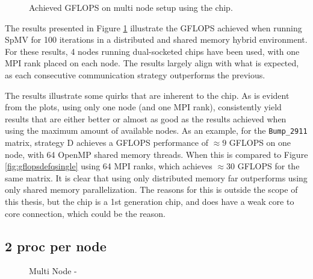 \begin{figure}[H]
    \centering
    \caption{Achieved GFLOPS on multi node setup using the  chip.}
    \label{fig:gflopsdefqmulti}
\end{figure}

The results presented in Figure \ref{fig:gflopsdefqmulti} illustrate the GFLOPS achieved when running SpMV for 100 iterations in a distributed and shared memory hybrid environment. For these results, 4 nodes running dual-socketed  chips have been used, with one MPI rank placed on each node. The results largely align with what is expected, as each consecutive communication strategy outperforms the previous.
\medskip

The results illustrate some quirks that are inherent to the  chip. As is evident from the plots, using only one node (and one MPI rank), consistently yield results that are either better or almost as good as the results achieved when using the maximum amount of available nodes. As an example, for the \texttt{Bump\_2911} matrix, strategy D achieves a GFLOPS performance of \(\approx 9\) GFLOPS on one node, with 64 OpenMP shared memory threads. When this is compared to Figure \ref{fig:gflopsdefqsingle} using 64 MPI ranks, which achieves \(\approx 30\) GFLOPS for the same matrix. It is clear that using only distributed memory far outperforms using only shared memory parallelization. The reasons for this is outside the scope of this thesis, but the  chip is a 1st generation chip, and does have a weak core to core connection, which could be the reason. 
\medskip

\begin{figure}[H]
    \centering
    \caption{}
    \label{fig:tcommdefqmulti}
\end{figure}


\begin{figure}[H]
    \centering
    \caption{}
    \label{}
\end{figure}

\subsection{2 proc per node}

\begin{figure}[H]
    \centering
    \caption{Multi Node - }
    \label{fig:gflopsdefqmpimulti}
\end{figure}

\begin{figure}[H]
    \centering
    \caption{}
    \label{fig:tcommdefqmpimulti}
\end{figure}


\begin{figure}[H]
    \centering
    \caption{}
    \label{}
\end{figure}
